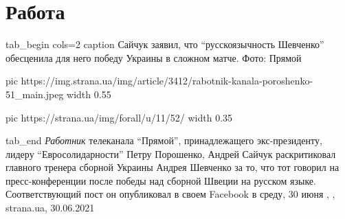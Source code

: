  
 
 
 
 
\chapter{Работа}

\ifcmt
tab_begin cols=2
	caption Сайчук заявил, что \enquote{русскоязычность Шевченко} обесценила для него победу Украины в сложном матче. Фото: Прямой

  pic https://img.strana.ua/img/article/3412/rabotnik-kanala-poroshenko-51_main.jpeg
	width 0.55

	pic https://strana.ua/img/forall/u/11/52/%
	width 0.35

tab_end
\fi
\emph{Работник} телеканала \enquote{Прямой}, принадлежащего экс-президенту, лидеру
\enquote{Евросолидарности} Петру Порошенко, Андрей Сайчук раскритиковал главного
тренера сборной Украины Андрея Шевченко за то, что тот говорил на
пресс-конференции после победы над сборной Швеции на русском языке.
Соответствующий пост он опубликовал в своем Facebook в среду, 30 июня
, , strana.ua, 30.06.2021
